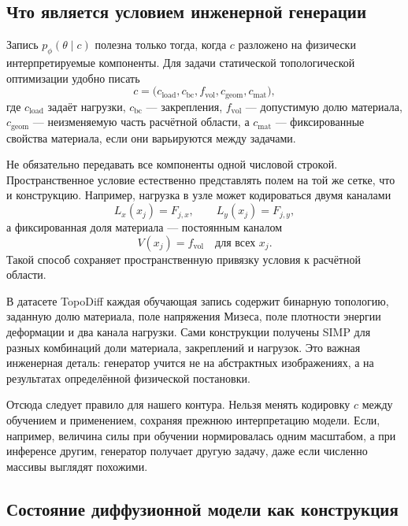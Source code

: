\subsection{Что является условием инженерной генерации}

Запись $p_\phi(\theta\mid c)$ полезна только тогда, когда $c$ разложено на физически интерпретируемые компоненты. Для задачи статической топологической оптимизации удобно писать
\begin{equation}
 c=\bigl(c_{\mathrm{load}},c_{\mathrm{bc}},f_{\mathrm{vol}},c_{\mathrm{geom}},c_{\mathrm{mat}}\bigr),
\end{equation}
где $c_{\mathrm{load}}$ задаёт нагрузки, $c_{\mathrm{bc}}$ --- закрепления, $f_{\mathrm{vol}}$ --- допустимую долю материала, $c_{\mathrm{geom}}$ --- неизменяемую часть расчётной области, а $c_{\mathrm{mat}}$ --- фиксированные свойства материала, если они варьируются между задачами.

Не обязательно передавать все компоненты одной числовой строкой. Пространственное условие естественно представлять полем на той же сетке, что и конструкцию. Например, нагрузка в узле может кодироваться двумя каналами
\begin{equation}
 L_x(x_j)=F_{j,x},
 \qquad
 L_y(x_j)=F_{j,y},
\end{equation}
а фиксированная доля материала --- постоянным каналом
\begin{equation}
 V(x_j)=f_{\mathrm{vol}}
 \quad\text{для всех }x_j.
\end{equation}
Такой способ сохраняет пространственную привязку условия к расчётной области.

В датасете TopoDiff каждая обучающая запись содержит бинарную топологию, заданную долю материала, поле напряжения Мизеса, поле плотности энергии деформации и два канала нагрузки. Сами конструкции получены SIMP для разных комбинаций доли материала, закреплений и нагрузок. Это важная инженерная деталь: генератор учится не на абстрактных изображениях, а на результатах определённой физической постановки.

Отсюда следует правило для нашего контура. Нельзя менять кодировку $c$ между обучением и применением, сохраняя прежнюю интерпретацию модели. Если, например, величина силы при обучении нормировалась одним масштабом, а при инференсе другим, генератор получает другую задачу, даже если численно массивы выглядят похожими.

\subsection{Состояние диффузионной модели как конструкция}


